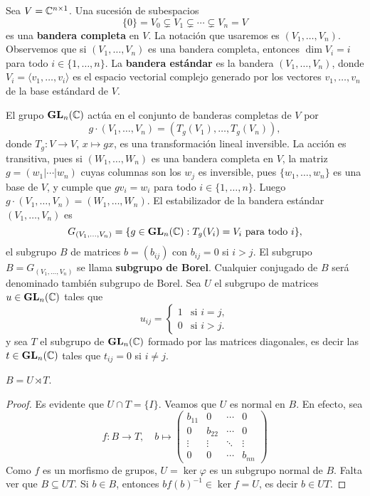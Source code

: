 Sea $V=\mathbb{C}^{n\times 1}$. Una sucesión de subespacios 
\[
\{0\}=V_0\subsetneq V_1\subsetneq \cdots\subsetneq V_n=V
\]
es una \textbf{bandera completa} en $V$. La notación que usaremos es $(V_1,\dots,V_n)$. Observemos
que si $(V_1,\dots,V_n)$ es una bandera completa, entonces $\dim V_i=i$ para todo $i\in\{1,\dots,n\}$. 
La \textbf{bandera estándar} es la bandera $(V_1,\dots,V_n)$, donde
$V_i=\langle v_1,\dots,v_i\rangle$ es el espacio vectorial complejo
generado por los vectores $v_1,\dots,v_n$ de la base estándard de $V$. 

El grupo $\mathbf{GL}_n(\mathbb{C})$ actúa en el conjunto de banderas completas de $V$ por 
\[
g\cdot (V_1,\dots,V_n)=(T_g(V_1),\dots,T_g(V_n)),
\]
donde $T_g\colon V\to V$, $x\mapsto gx$, es una transformación lineal inversible. La acción es transitiva, pues
si $(W_1,\dots,W_n)$ es una bandera completa en $V$, la matriz
$g=(w_1|\cdots|w_n)$ cuyas columnas son los $w_j$ es inversible, pues $\{w_1,\dots,w_n\}$ es una base de $V$, 
y cumple que
$gv_i=w_i$ para todo $i\in\{1,\dots,n\}$. Luego $g\cdot (V_1,\dots,V_n)=(W_1,\dots,W_n)$. 
El estabilizador de la bandera estándar $(V_1,\dots,V_n)$ es
\[
G_{(V_1,\dots,V_n)}=\{g\in\mathbf{GL}_n(\mathbb{C}):T_g(V_i)=V_i\text{ para todo $i$}\},
\]
el subgrupo $B$ de matrices $b=(b_{ij})$ con $b_{ij}=0$ si $i>j$. 
El subgrupo $B=G_{(V_1,\dots,V_n)}$ se llama \textbf{subgrupo de Borel}.
Cualquier conjugado de $B$ será denominado también subgrupo de Borel. 
Sea $U$ 
el subgrupo de matrices $u\in\mathbf{GL}_n(\mathbb{C})$ tales que 
\[
u_{ij}=\begin{cases}
1 & \text{si $i=j$},\\
0 & \text{si $i>j$}.	
\end{cases}
\]
y sea $T$ el subgrupo de $\mathbf{GL}_n(\mathbb{C})$ formado por las matrices diagonales, es decir
las $t\in\mathbf{GL}_n(\mathbb{C})$ tales que $t_{ij}=0$ si $i\ne j$. 

\begin{proposition}
$B=U\rtimes T$.	
\end{proposition}

\begin{proof}
Es evidente que $U\cap T=\{I\}$. Veamos que $U$ es normal en $B$. En efecto, sea 
\[
f\colon B\to T,\quad b\mapsto\begin{pmatrix}
b_{11} & 0 & \cdots & 0\\
0 & b_{22} & \cdots & 0\\
\vdots & \vdots & \ddots & \vdots\\
0 & 0 & \cdots & b_{nn}	
\end{pmatrix}
\]
Como $f$ es un morfismo de grupos, $U=\ker\varphi$ es un subgrupo normal de $B$. Falta ver que 
$B\subseteq UT$. Si $b\in B$, entonces
$bf(b)^{-1}\in\ker f=U$, es decir 
$b\in UT$. 
\end{proof}

